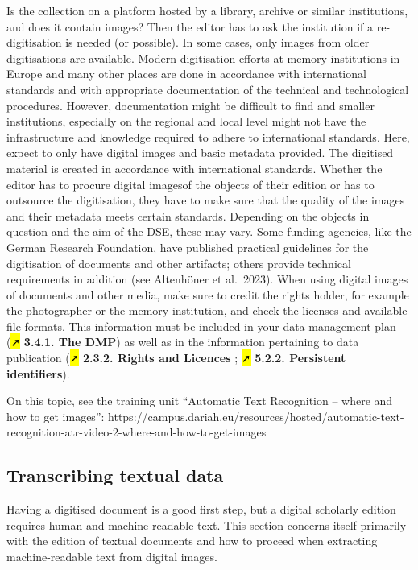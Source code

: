 \documentclass[
  letterpaper,
  DIV=11,
  numbers=noendperiod]{scrreprt}
\begin{document}
Is the collection on a platform hosted by a library, archive or similar
institutions, and does it contain images? Then the editor has to ask the
institution if a re-digitisation is needed (or possible). In some cases,
only images from older digitisations are available. Modern digitisation
efforts at memory institutions in Europe and many other places are done
in accordance with international standards and with appropriate
documentation of the technical and technological procedures. However,
documentation might be difficult to find and smaller institutions,
especially on the regional and local level might not have the
infrastructure and knowledge required to adhere to international
standards. Here, expect to only have digital images and basic metadata
provided. The digitised material is created in accordance with
international standards. Whether the editor has to procure digital
imagesof the objects of their edition or has to outsource the
digitisation, they have to make sure that the quality of the images and
their metadata meets certain standards. Depending on the objects in
question and the aim of the DSE, these may vary. Some funding agencies,
like the German Research Foundation, have published practical guidelines
for the digitisation of documents and other artifacts; others provide
technical requirements in addition (see Altenhöner et al.~2023). When
using digital images of documents and other media, make sure to credit
the rights holder, for example the photographer or the memory
institution, and check the licenses and available file formats. This
information must be included in your data management plan (\hl{➚}
\textbf{3.4.1. The DMP}) as well as in the information pertaining to
data publication (\hl{➚} \textbf{2.3.2. Rights and Licences} ; \hl{➚}
\textbf{5.2.2. Persistent identifiers}).

On this topic, see the training unit ``Automatic Text Recognition --
where and how to get images'':
https://campus.dariah.eu/resources/hosted/automatic-text-recognition-atr-video-2-where-and-how-to-get-images

\subsection{Transcribing textual data}\label{transcribing-textual-data}

Having a digitised document is a good first step, but a digital
scholarly edition requires human and machine-readable text. This section
concerns itself primarily with the edition of textual documents and how
to proceed when extracting machine-readable text from digital images.
\end{document}
